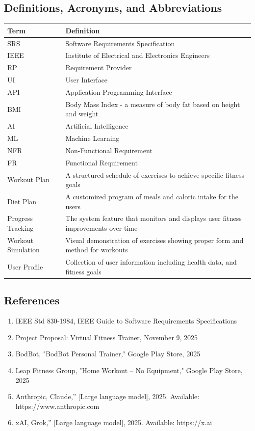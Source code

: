 \documentclass[12pt,a4paper]{article}
\begin{document}
\subsection{Definitions, Acronyms, and Abbreviations}
\begin{table}[H]
\centering
\begin{tabular}{|p{4cm}|p{9cm}|}
\hline
\textbf{Term} & \textbf{Definition} \\
\hline
SRS & Software Requirements Specification \\
\hline
IEEE & Institute of Electrical and Electronics Engineers \\
\hline
RP & Requirement Provider \\
\hline
UI & User Interface \\
\hline
API & Application Programming Interface \\
\hline
BMI & Body Mass Index - a measure of body fat based on height and weight \\
\hline
AI & Artificial Intelligence \\
\hline
ML & Machine Learning \\
\hline
NFR & Non-Functional Requirement \\
\hline
FR & Functional Requirement \\
\hline
Workout Plan & A structured schedule of exercises to achieve specific fitness goals \\
\hline
Diet Plan & A customized program of meals and caloric intake for the users\\
\hline
Progress Tracking & The system feature that monitors and displays user fitness improvements over time \\
\hline
Workout Simulation & Visual demonstration of exercises showing proper form and method for workouts \\
\hline
User Profile & Collection of user information including health data, and fitness goals \\
\hline
\end{tabular}
\end{table}
\subsection{References}
\begin{enumerate}
    \item IEEE Std 830-1984, IEEE Guide to Software Requirements Specifications
    \item Project Proposal: Virtual Fitness Trainer, November 9, 2025
    \item BodBot, "BodBot Personal Trainer," Google Play Store, 2025
    \item Leap Fitness Group, "Home Workout – No Equipment," Google Play Store, 2025
    \item Anthropic, Claude,'' [Large language model], 2025. Available: https://www.anthropic.com 
    \item xAI, Grok,'' [Large language model], 2025. Available: https://x.ai
\end{enumerate}
\end{document}
